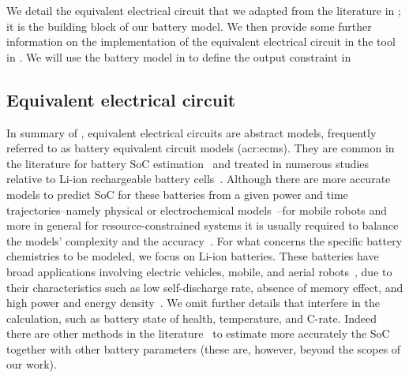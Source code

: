 We detail the equivalent electrical circuit that we adapted from the literature in ; it is the building block of our battery model. We then provide some further information on the implementation of the equivalent electrical circuit in the \powprof{} tool in . We will use the battery model in  to define the output constraint in 

\subsection{Equivalent electrical circuit}
\label{sec:batmod-circuit}

In summary of , equivalent electrical circuits are abstract models, frequently referred to as battery equivalent circuit models (\Gls{acr:ecm}s). They are common in the literature for battery SoC estimation~\citep{zhang2018online} and treated in numerous studies relative to Li-ion rechargeable battery cells~\citep{hinz2019comparison,hasan2018exogenous}. Although there are more accurate models to predict SoC for these batteries from a given power and time trajectories--namely physical or electrochemical models~\citep{rao2003battery}--for mobile robots and more in general for resource-constrained systems it is usually required to balance the models' complexity and the accuracy~\citep{rao2003battery,hasan2018exogenous}. 
For what concerns the specific battery chemistries to be modeled, we focus on Li-ion batteries. These batteries have broad applications involving electric vehicles, mobile, and aerial robots~\citep{shi2006application,xia2015state,hasan2018exogenous,zhang2014battery}, due to their characteristics such as low self-discharge rate, absence of memory effect, and high power and energy density~\citep{zhang2014battery}. We omit further details that interfere in the calculation, such as battery state of health, temperature, and C-rate. Indeed there are other methods in the literature~\citep{lu2013review,zhang2018state,espedal2021current} to estimate more accurately the SoC together with other battery parameters (these are, however, beyond the scopes of our work). 


